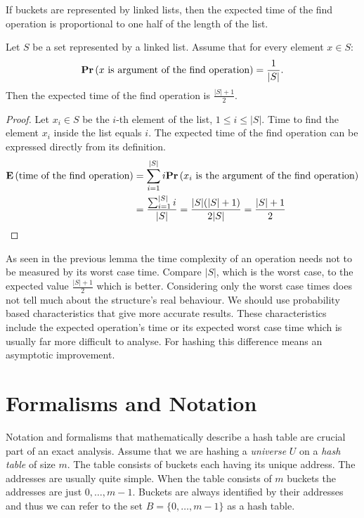 If buckets are represented by linked lists, then the expected time of the find operation is proportional to one half of the length of the list.
\begin{lemma}
\label{lemma-expected-list-time}
Let $S$ be a set represented by a linked list. Assume that for every element $x \in S$: \[ \mathbf{Pr}\left(x \text{ is argument of the find operation}\right) = \frac{1}{|S|} \text{.} \] Then the expected time of the find operation is $\frac{|S| + 1}{2}$.
\end{lemma}
\begin{proof}
Let $x_i \in S$ be the $i$-th element of the list, $1 \leq i \leq |S|$. Time to find the element $x_i$ inside the list equals $i$. The expected time of the find operation can be expressed directly from its definition. 
\[
\begin{split}
\mathbf{E}\left(\text{time of the find operation}\right) 
	& = \displaystyle\sum_{i = 1}^{|S|} i \mathbf{Pr}\left(x_i \text{ is the argument of the find operation}\right) \\
	& = \frac{\sum_{i = 1}^{|S|}{i}}{|S|} = \frac{|S|(|S| + 1)}{2 |S|} = \frac{|S| + 1}{2} \\
\end{split}
\]
\end{proof}

As seen in the previous lemma the time complexity of an operation needs not to be measured by its worst case time. Compare $|S|$, which is the worst case, to the expected value $\frac{|S| + 1}{2}$ which is better. Considering only the worst case times does not tell much about the structure's real behaviour. We should use probability based characteristics that give more accurate results. These characteristics include the expected operation's time or its expected worst case time which is usually far more difficult to analyse. For hashing this difference means an asymptotic improvement.

\section{Formalisms and Notation}
Notation and formalisms that mathematically describe a hash table are crucial part of an exact analysis. Assume that we are hashing a \emph{universe} $U$ on a \emph{hash table} of size $m$. The table consists of buckets each having its unique address. The addresses are usually quite simple. When the table consists of $m$ buckets the addresses are just $0, \dots, m - 1$. Buckets are always identified by their addresses and thus we can refer to the set $B = \{0, \dots, m - 1\}$ as a hash table.

